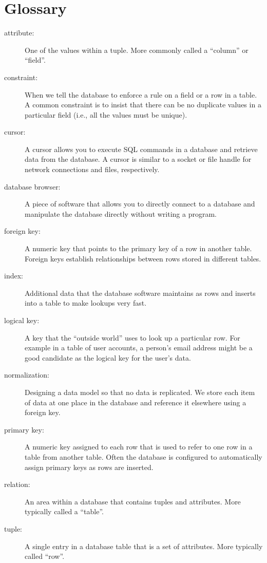 \section{Glossary}

\begin{description}

\item[attribute:] One of the values within a tuple.  More commonly
called a ``column'' or ``field''.

\item[constraint:] 
When we tell the database to enforce a rule on a field or a row
in a table.  A common constraint is to insist that there can be no
duplicate values in a particular field (i.e., all the values must be unique).

\item[cursor:] A cursor allows you to execute SQL commands in a database
and retrieve data from the database.  A cursor is similar to 
a socket or file handle for network connections and files, respectively.

\item[database browser:] 
A piece of software that allows you to directly connect to a database 
and manipulate the database directly without writing a program.

\item[foreign key:] A numeric key that points to the primary key of 
a row in another table.  Foreign keys establish relationships between rows
stored in different tables.

\item[index:] Additional data that the database software maintains as rows
and inserts into a table to make lookups very fast.

\item[logical key:] A key that the ``outside world'' uses to look up a particular
row.  For example in a table of user accounts, a person's email address
might be a good candidate as the logical key for the user's data. 

\item[normalization:] Designing a data model so that no data
is replicated.  We store each item of data at one place in the database
and reference it elsewhere using a foreign key.

\item[primary key:] A numeric key assigned to each row that is used to 
refer to one row in a table from another table.  Often the database
is configured to automatically assign primary keys as rows are inserted.

\item[relation:] An area within a database that contains tuples and 
attributes.  More typically called a ``table''.

\item[tuple:] A single entry in a database table that is a set 
of attributes.  More typically called ``row''.

\end{description}

